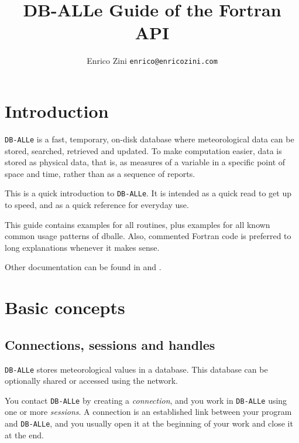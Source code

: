 \documentclass[final,12pt,a4paper,twoside]{book}
\title{DB-ALLe Guide of the Fortran API}
\author{Enrico Zini \hfil {\tt enrico@enricozini.com}}
\newcommand{\dballe}{{\tt DB-ALLe}}
\begin{document}


\maketitle


\tableofcontents

\chapter {Introduction}
\label{ch-intro}

\dballe{} is a fast, temporary, on-disk database where meteorological data can
be stored, searched, retrieved and updated.  To make computation easier, data
is stored as physical data, that is, as measures of a variable in a specific
point of space and time, rather than as a sequence of reports.

This is a quick introduction to \dballe{}.  It is intended as a quick read to
get up to speed, and as a quick reference for everyday use.


This guide contains examples for all routines, plus examples for all known
common usage patterns of dballe.  Also, commented Fortran code is preferred
to long explanations whenever it makes sense.

Other documentation can be found in \cite{UserGuide} and \cite{LibDoc}.

\chapter {Basic concepts}
\label{ch-concepts}

\section{Connections, sessions and handles}

\dballe{} stores meteorological values in a database.  This database can be
optionally shared or accessed using the network.

You contact \dballe{} by creating a \emph{connection}, and you work in
\dballe{} using one or more \emph{sessions}.  A connection is an established
link between your program and \dballe{}, and you usually open it at the
beginning of your work and close it at the end.
\end{document}
